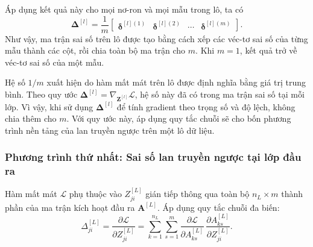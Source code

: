 Áp dụng kết quả này cho mọi nơ-ron và mọi mẫu trong lô, ta có
\begin{equation}
\label{eq:bpb_delta_columns}
\boldsymbol{\Delta}^{[l]}
=\frac{1}{m}
\begin{bmatrix}
\boldsymbol{\delta}^{[l](1)} &
\boldsymbol{\delta}^{[l](2)} &
\cdots &
\boldsymbol{\delta}^{[l](m)}
\end{bmatrix}.
\end{equation}
Như vậy, ma trận sai số trên lô được tạo bằng cách xếp các
véc-tơ sai số của từng mẫu thành các cột, rồi chia toàn bộ
ma trận cho $m$. Khi $m=1$, kết quả trở về véc-tơ sai số
của một mẫu.

Hệ số $1/m$ xuất hiện do hàm mất mát trên lô được định nghĩa
bằng giá trị trung bình. Theo quy ước $\boldsymbol{\Delta}^{[l]}=\nabla_{\mathbf{Z}^{[l]}}\mathcal{L}$, hệ số này đã có trong ma trận sai số tại mỗi lớp. Vì vậy, khi sử dụng $\boldsymbol{\Delta}^{[l]}$ để tính gradient theo trọng số và độ lệch, không chia thêm cho $m$.
Với quy ước này, áp dụng quy tắc chuỗi sẽ cho bốn phương trình nền tảng của lan truyền ngược trên một lô dữ liệu.

\subsubsection{Phương trình thứ nhất: Sai số lan truyền ngược tại lớp đầu ra}
 
Hàm mất mát $\mathcal{L}$ phụ thuộc vào $Z_{ji}^{[L]}$ gián tiếp thông qua toàn bộ $n_L \times m$ thành phần của ma trận kích hoạt đầu ra $\mathbf{A}^{[L]}$. Áp dụng quy tắc chuỗi đa biến:
\begin{equation}
\Delta_{ji}^{[L]} = \frac{\partial\mathcal{L}}{\partial Z_{ji}^{[L]}} = \sum_{k=1}^{n_L}\sum_{s=1}^{m} \frac{\partial\mathcal{L}}{\partial A_{ks}^{[L]}}\,\frac{\partial A_{ks}^{[L]}}{\partial Z_{ji}^{[L]}}.
\label{eq:bpb_chain_output}
\end{equation}
 
